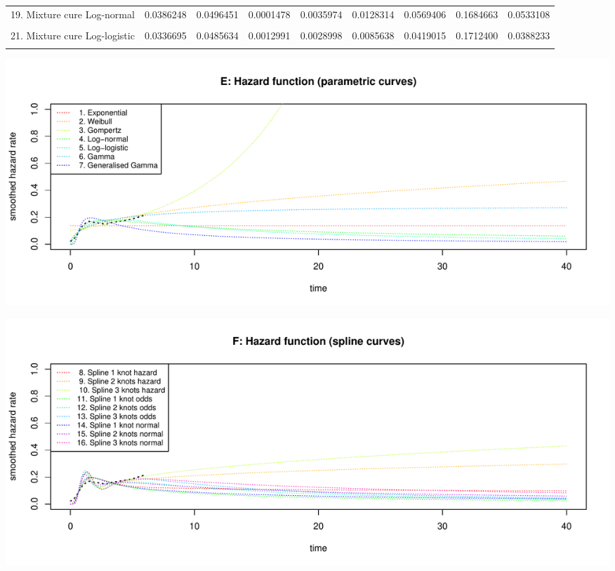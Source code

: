 \documentclass[]{article}
\begin{document}
\begin{table}
{\begin{tabular}[t]{lrrrrrrrr}
19. Mixture cure Log-normal & 0.0386248 & 0.0496451 & 0.0001478 & 0.0035974 & 0.0128314 & 0.0569406 & 0.1684663 & 0.0533108\\
\cellcolor{gray!6}{20. Non-mixture cure Log-normal} & \cellcolor{gray!6}{0.0369202} & \cellcolor{gray!6}{0.0476273} & \cellcolor{gray!6}{0.0001962} & \cellcolor{gray!6}{0.0048679} & \cellcolor{gray!6}{0.0133317} & \cellcolor{gray!6}{0.0491721} & \cellcolor{gray!6}{0.1721086} & \cellcolor{gray!6}{0.0441369}\\
21. Mixture cure Log-logistic & 0.0336695 & 0.0485634 & 0.0012991 & 0.0028998 & 0.0085638 & 0.0419015 & 0.1712400 & 0.0388233\\
\cellcolor{gray!6}{22. Non-mixture cure Log-logistic} & \cellcolor{gray!6}{0.0321761} & \cellcolor{gray!6}{0.0482523} & \cellcolor{gray!6}{0.0010967} & \cellcolor{gray!6}{0.0024492} & \cellcolor{gray!6}{0.0073855} & \cellcolor{gray!6}{0.0377612} & \cellcolor{gray!6}{0.1712106} & \cellcolor{gray!6}{0.0351424}\\
\bottomrule
\end{tabular}}
\end{table}

\begin{flushleft}\includegraphics[height=0.29\textheight]{Images/validate_extrapolation2-5} \end{flushleft}

\begin{flushleft}\includegraphics[height=0.29\textheight]{Images/validate_extrapolation2-6} \end{flushleft}
\end{document}
